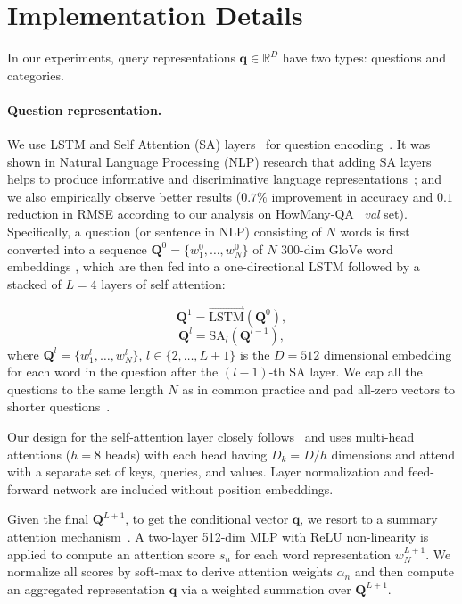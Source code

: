 \documentclass{article} \usepackage[dvipsnames,table]{xcolor}
\def\rvq{{\mathbf{q}}}
\def\rmQ{{\mathbf{Q}}}
\begin{document}
\section{Implementation Details\label{sec:detail}}
In our experiments, query representations $\rvq {\in} \mathbb{R}^D$ have two types: questions and categories. 

\paragraph{Question representation.} We use LSTM and Self Attention (SA) layers~\cite{vaswani2017attention} for question encoding~\cite{yu2019deep}. It was shown in Natural Language Processing (NLP) research that adding SA layers helps to produce informative and discriminative language representations~\cite{devlin2019bert}; and we also empirically observe better results ($0.7\%$ improvement in accuracy and $0.1$ reduction in RMSE according to our analysis on HowMany-QA~\cite{trott2018interpretable} \emph{val} set). Specifically, a question (or sentence in NLP) consisting of $N$ words is first converted into a sequence $\rmQ^0 {=} \{w^0_1, \ldots, w^0_N\}$ of $N$ 300-dim GloVe word embeddings \cite{pennington2014glove}, which are then fed into a one-directional LSTM followed by a stacked of $L{=}$4 layers of self attention:

\begin{equation}\label{eqn:lstm}
\rmQ^1 = \overrightarrow{\text{LSTM}}(\rmQ^0),
\end{equation}
\begin{equation}\label{eqn:sa}
\rmQ^l = \text{SA}_l(\rmQ^{l-1}),
\end{equation}
where $\rmQ^l {=} \{w^l_{1}, \ldots, w^l_{N}\}$, $l{\in}\{2, \ldots, L+1\}$ is the $D{=}512$ dimensional embedding for each word in the question after the $(l{-}1)$-th SA layer. We cap all the questions to the same length $N$ as in common practice and pad all-zero vectors to shorter questions~\cite{nguyen2018improved}.

Our design for the self-attention layer closely follows~\cite{vaswani2017attention} and uses multi-head attentions ($h{=}8$ heads) with each head having $D_k{=}D/h$ dimensions and attend with a separate set of keys, queries, and values. Layer normalization and feed-forward network are included without position embeddings.

Given the final $\rmQ^{L+1}$, to get the conditional vector $\mathbf{q}$, we resort to a summary attention mechanism~\cite{nguyen2018improved}. A two-layer 512-dim MLP with ReLU non-linearity is applied to compute an attention score $s_n$ for each word representation $w^{L+1}_{N}$. We normalize all scores by soft-max to derive attention weights $\alpha_n$ and then compute an aggregated representation $\mathbf{q}$ via a weighted summation over $\rmQ^{L+1}$.
\end{document}
